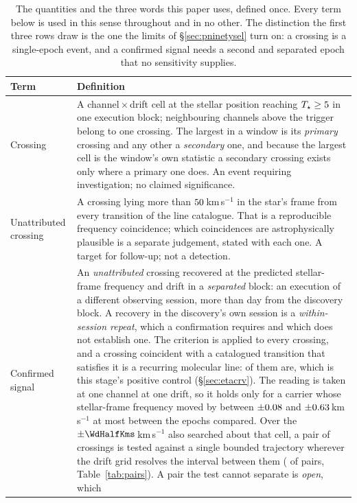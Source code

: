 \begin{table}
\centering
\caption{The quantities and the three words this paper uses, defined once.
Every term below is used in this sense throughout and in no other. The
distinction the first three rows draw is the one the limits of
\S\ref{sec:pninetysel} turn on: a crossing is a single-epoch event, and a
confirmed signal needs a second and separated epoch that no sensitivity
supplies.}
\label{tab:quantities}
\small
\begin{tabular}{@{}p{}p{}@{}}
\hline
Term & Definition \\
\hline
Crossing &
A channel\,$\times$\,drift cell at the stellar position reaching
$T_\star\geq5$ in one execution block; neighbouring channels
above the trigger belong to one crossing. The largest in a window is its
\emph{primary} crossing and any other a \emph{secondary} one, and because the
largest cell is the window's own statistic a secondary crossing exists only
where a primary one does. An event requiring investigation; no claimed
significance. \\
Unattributed crossing &
A crossing lying more than $50$\,km\,s$^{-1}$ in the star's frame
from every transition of the line catalogue. That is a reproducible frequency
coincidence; which coincidences are astrophysically plausible is a separate
judgement, stated with each one. A target for follow-up; not a detection. \\
Confirmed signal &
An \emph{unattributed} crossing recovered at the predicted stellar-frame
frequency and drift in a \emph{separated} block: an execution of a different
observing session, more than \EpSep{} day from the discovery block. A
recovery in the discovery's own session is a \emph{within-session repeat},
which a confirmation requires and which does not establish one. The criterion is
applied to every crossing, and a crossing coincident with a catalogued
transition that satisfies it is a recurring molecular line:
\MkAttrRecur{} of them are, which is this stage's positive control
(\S\ref{sec:etacrv}). The reading is taken at one channel at one drift, so it holds only for a
carrier whose stellar-frame frequency moved by between $\pm0.08$ and
$\pm0.63$\,km\,s$^{-1}$ at most between the epochs compared. Over the
$\pm\WdHalfKms$\,km\,s$^{-1}$ also searched about that cell, a pair of
crossings is tested against a single bounded trajectory wherever the drift
grid resolves the interval between them (\TjNPower{} of \TjNPair{} pairs,
Table~\ref{tab:pairs}). A pair the test cannot separate is \emph{open}, which

\end{tabular}
\end{table}
